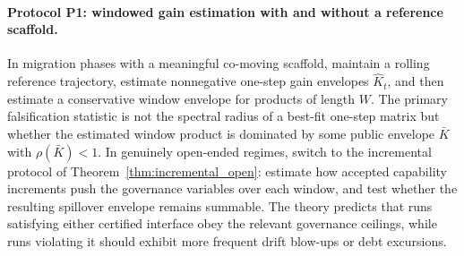 \documentclass[11pt]{article}
\theoremstyle{definition}
\newcommand{\1}{\mathbf{1}}
\begin{document}
\paragraph{Protocol P1: windowed gain estimation with and without a reference scaffold.} In migration phases with a meaningful co-moving scaffold, maintain a rolling reference trajectory, estimate nonnegative one-step gain envelopes $\widehat K_t$, and then estimate a conservative window envelope for products of length $W$. The primary falsification statistic is not the spectral radius of a best-fit one-step matrix but whether the estimated window product is dominated by some public envelope $\bar K$ with $\rho(\bar K)<1$. In genuinely open-ended regimes, switch to the incremental protocol of Theorem~\ref{thm:incremental_open}: estimate how accepted capability increments push the governance variables over each window, and test whether the resulting spillover envelope remains summable. The theory predicts that runs satisfying either certified interface obey the relevant governance ceilings, while runs violating it should exhibit more frequent drift blow-ups or debt excursions.
\end{document}

